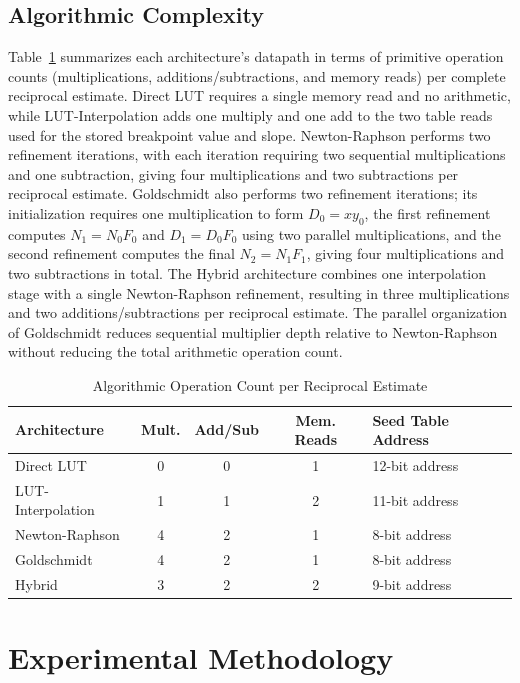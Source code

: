 \documentclass[manuscript,screen,review]{acmart}
\begin{document}
\subsection{Algorithmic Complexity}

Table~\ref{tab:opcount} summarizes each architecture's datapath in terms of primitive operation counts (multiplications, additions/subtractions, and memory reads) per complete reciprocal estimate. Direct LUT requires a single memory read and no arithmetic, while LUT-Interpolation adds one multiply and one add to the two table reads used for the stored breakpoint value and slope. Newton-Raphson performs two refinement iterations, with each iteration requiring two sequential multiplications and one subtraction, giving four multiplications and two subtractions per reciprocal estimate. Goldschmidt also performs two refinement iterations; its initialization requires one multiplication to form $D_0 = xy_0$, the first refinement computes $N_1 = N_0 F_0$ and $D_1 = D_0 F_0$ using two parallel multiplications, and the second refinement computes the final $N_2 = N_1 F_1$, giving four multiplications and two subtractions in total. The Hybrid architecture combines one interpolation stage with a single Newton-Raphson refinement, resulting in three multiplications and two additions/subtractions per reciprocal estimate. The parallel organization of Goldschmidt reduces sequential multiplier depth relative to Newton-Raphson without reducing the total arithmetic operation count.

\begin{table}[H]
\caption{Algorithmic Operation Count per Reciprocal Estimate}
\label{tab:opcount}
\begin{tabular}{@{}lcccl@{}}
\toprule
\textbf{Architecture} & \textbf{Mult.} & \textbf{Add/Sub} & \textbf{Mem. Reads} & \textbf{Seed Table Address} \\
\midrule
Direct LUT & 0 & 0 & 1 & 12-bit address \\
LUT-Interpolation & 1 & 1 & 2 & 11-bit address \\
Newton-Raphson & 4 & 2 & 1 & 8-bit address \\
Goldschmidt & 4 & 2 & 1 & 8-bit address \\
Hybrid & 3 & 2 & 2 & 9-bit address \\
\bottomrule
\end{tabular}
\end{table}

\section{Experimental Methodology}
\label{sec:methodology}
\end{document}
